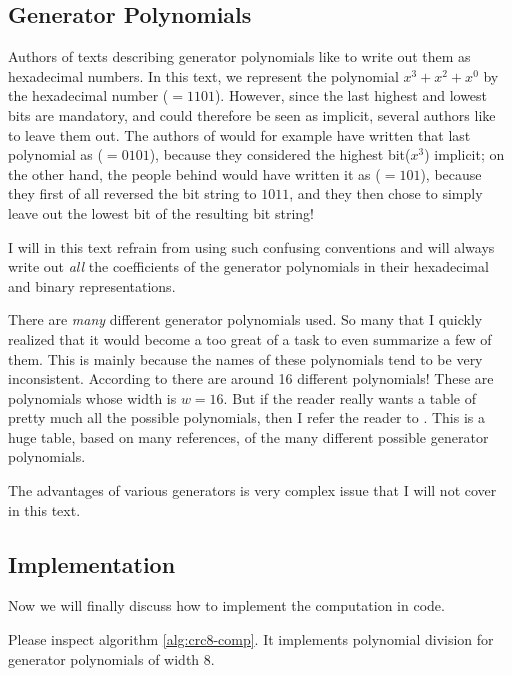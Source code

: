 \subsection{Generator Polynomials}

Authors of texts describing generator polynomials like to write out
them as hexadecimal numbers. In this text, we represent the polynomial
$x^3 + x^2 + x^0$ by the hexadecimal number ($=1101$). However,
since the last highest and lowest bits are mandatory, and could
therefore be seen as implicit, several authors like to leave them
out. The authors of \cite{press2007numerical_recipes} would for
example have written that last polynomial as ($=0101$), because
they considered the highest bit($x^{3}$) implicit; on the other hand,
the people behind \cite{Koopman04cyclicredundancy_embedded_networks}
would have written it as ($=101$), because they first of all
reversed the bit string to $1011$, and they then chose to simply leave
out the lowest bit of the resulting bit string!

I will in this text refrain from using such confusing conventions and
will always write out \textit{all} the coefficients of the generator
polynomials in their hexadecimal and binary representations.

There are \textit{many} different \crc generator polynomials used. So
many that I quickly realized that it would become a too great of a
task to even summarize a few of them. This is mainly because the names
of these polynomials tend to be very inconsistent. According to
\cite{cook:_catal_crc} there are around 16 different \crcst
polynomials! These are polynomials whose width is $w=16$. But if the
reader really wants a table of pretty much all the possible
polynomials, then I refer the reader to \cite{cook:_catal_crc}. This
is a huge table, based on many references, of the many different
possible generator polynomials.

The advantages of various generators is very complex issue that I will
not cover in this text.

\subsection{Implementation}

Now we will finally discuss how to implement the \crc computation in
code.

Please inspect algorithm \ref{alg:crc8-comp}. It implements
polynomial division for generator polynomials of width 8.

